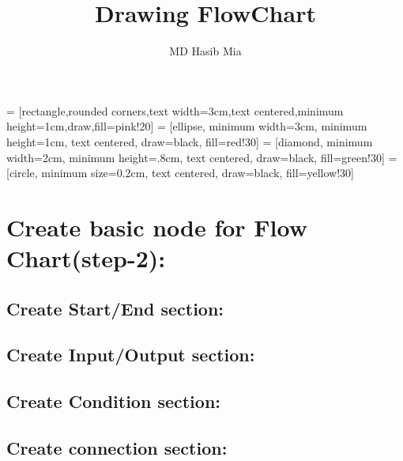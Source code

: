 \documentclass{article}
\title{Drawing FlowChart}
\author{MD Hasib Mia}
\begin{document}
	\maketitle
	\tableofcontents
	\clearpage
	 = [rectangle,rounded corners,text width=3cm,text centered,minimum height=1cm,draw,fill=pink!20]
     = [ellipse, minimum width=3cm, minimum height=1cm, text centered, draw=black, fill=red!30]
     = [diamond, minimum width=2cm, minimum height=.8cm, text centered, draw=black, fill=green!30]
     = [circle, minimum size=0.2cm, text centered, draw=black, fill=yellow!30]
   
   
    \section{Create basic node for Flow Chart(step-2):}
    \subsection{Create Start/End section:}
    
    
    
     \subsection{Create Input/Output section:}
    
    
    
    \subsection{Create Condition section:}
    
    
    
    \subsection{Create connection section:}
    
\end{document}
